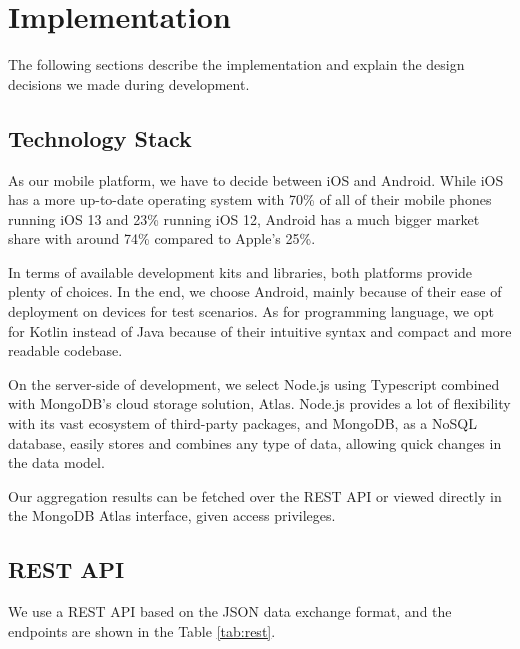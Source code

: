 
\chapter{Implementation}\label{chapter:implementation}

The following sections describe the implementation and explain the design decisions we made during development. 

\section{Technology Stack}

As our mobile platform, we have to decide between iOS and Android. While iOS has a more up-to-date operating system with 70\% of all of their mobile phones running iOS 13 and 23\% running iOS 12, Android has a much bigger market share with around 74\% compared to Apple's 25\%\cite{android1}\cite{android2}.

In terms of available development kits and libraries, both platforms provide plenty of choices. In the end, we choose Android, mainly because of their ease of deployment on devices for test scenarios. As for programming language, we opt for Kotlin instead of Java because of their intuitive syntax and compact and more readable codebase.

On the server-side of development, we select Node.js \cite{node} using Typescript combined with MongoDB's \cite{mongo} cloud storage solution, Atlas. Node.js provides a lot of flexibility with its vast ecosystem of third-party packages, and MongoDB, as a NoSQL database, easily stores and combines any type of data, allowing quick changes in the data model.

Our aggregation results can be fetched over the REST API or viewed directly in the MongoDB Atlas interface, given access privileges.

\section{REST API}
\label{sec:api}
We use a REST API based on the JSON data exchange format, and the endpoints are shown in the Table \ref{tab:rest}.

